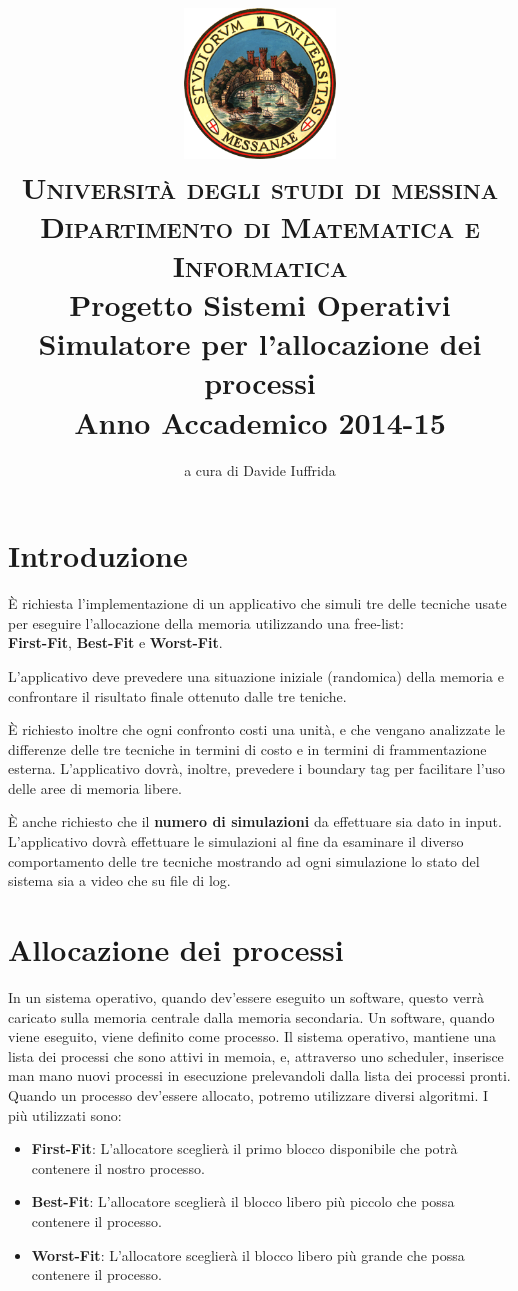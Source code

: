\documentclass[20pt,a4paper,oneside]{article}
\title{\center \includegraphics[width=4cm]{logo_UniME}\\
\textsc{\huge{Università degli studi di messina}}\\
\textsc{\Large{Dipartimento di Matematica e Informatica}}\\[2cm]
\textbf{\Huge{Progetto Sistemi Operativi}\\
\huge{Simulatore per l'allocazione dei processi}\\
\large{Anno Accademico 2014-15}}}
\author{ a cura di\Large{ Davide Iuffrida }}
\date{}
\begin{document}
\maketitle
\newpage
{}
\tableofcontents
\newpage
{}

\fontsize{14}{14}\selectfont

\section{Introduzione}
È richiesta l'implementazione di un applicativo che simuli tre delle tecniche usate per eseguire l'allocazione
della memoria utilizzando una free-list: \\
\textbf{First-Fit}, \textbf{Best-Fit} e \textbf{Worst-Fit}. \par
L'applicativo deve prevedere una situazione iniziale (randomica) della memoria e confrontare il risultato finale
ottenuto dalle tre teniche. \par
È richiesto inoltre che ogni confronto costi una unità, e che vengano analizzate le differenze delle tre tecniche
in termini di costo e in termini di frammentazione esterna. L'applicativo dovrà, inoltre, prevedere i boundary tag
per facilitare l'uso delle aree di memoria libere.\par
È anche richiesto che il \textbf{numero di simulazioni} da effettuare sia dato
in input. L'applicativo dovrà effettuare le simulazioni al fine da esaminare il diverso comportamento delle tre tecniche
mostrando ad ogni simulazione lo stato del sistema sia a video che su file di log. \par

\section{Allocazione dei processi}
In un sistema operativo, quando dev'essere eseguito un software, questo verrà caricato sulla memoria centrale dalla memoria secondaria. Un software, quando viene eseguito, viene definito come processo. Il sistema operativo, mantiene una lista dei processi che sono attivi in memoia, e, attraverso uno scheduler, inserisce man mano nuovi processi in esecuzione prelevandoli dalla lista dei processi pronti. Quando un processo dev'essere allocato, potremo utilizzare diversi algoritmi. I più utilizzati sono:

\begin{itemize}

\item \textbf{First-Fit}: L'allocatore sceglierà il primo blocco disponibile che potrà contenere il nostro processo.
\item \textbf{Best-Fit}: L'allocatore sceglierà il blocco libero più piccolo che possa contenere il processo.
\item \textbf{Worst-Fit}: L'allocatore sceglierà il blocco libero più grande che possa contenere il processo.

\end{itemize}
\end{document}
